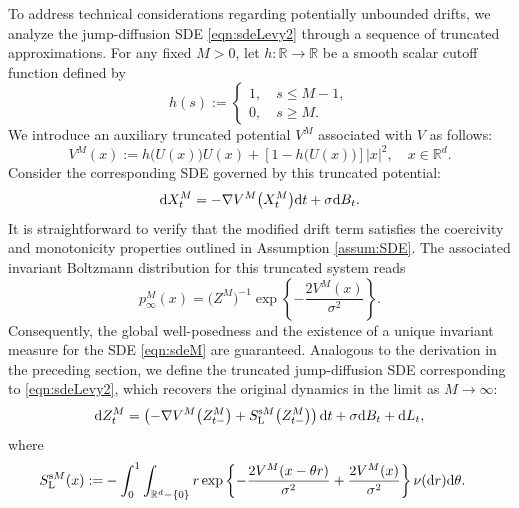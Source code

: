 To address technical considerations regarding potentially unbounded drifts, we analyze the jump-diffusion SDE \eqref{eqn:sdeLevy2} through a sequence of truncated approximations. For any fixed $M>0$, let $h:\mathbb{R}\to\mathbb{R}$ be a smooth scalar cutoff function defined by
\begin{equation}
    h(s):=\begin{cases}
        1,\quad s\leq M-1,\\
        0,\quad s\geq M.
    \end{cases}
\end{equation}
We introduce an auxiliary truncated potential $V^M$ associated with $V$ as follows:
\begin{equation}\label{VM}
    V^M(x):= h\big(U(x)\big)U(x) + \left[1-h\big (U(x)\big )\right]|x|^2,\quad x\in\mathbb{R}^d.
\end{equation}
Consider the corresponding SDE governed by this truncated potential:
\begin{equation}\label{eqn:sdeM}
    \mathrm{d} X^M_t= -\nabla V^M\big(X^M_t\big)\mathrm{d} t + \sigma \mathrm{d} B_t.
\end{equation}
It is straightforward to verify that the modified drift term satisfies the coercivity and monotonicity properties outlined in Assumption \ref{assum:SDE}. The associated invariant Boltzmann distribution for this truncated system reads
\begin{equation}\label{p^M_infty}
    p^M_\infty(x)=\big(Z^M\big)^{-1}\exp\left\{-\frac{2V^M(x)}{\sigma^2}\right\}.
\end{equation}
Consequently, the global well-posedness and the existence of a unique invariant measure for the SDE \eqref{eqn:sdeM} are guaranteed. Analogous to the derivation in the preceding section, we define the truncated jump-diffusion SDE corresponding to \eqref{eqn:sdeLevy2}, which recovers the original dynamics in the limit as $M\to\infty$:
\begin{equation}\label{eqn:sdeLevy2M}
    \mathrm{d} Z^M_t=\left(-\nabla V^M\big(Z^M_{t-}\big) + S^{\mathrm{s}M}_\mathrm{L}\big( Z^M_{t-}\big) \right)\mathrm{d} t+ \sigma \mathrm{d} B_t + \mathrm{d} L_t,
\end{equation}
where
\begin{equation}
\begin{aligned}
    S^{\mathrm{s}M}_\mathrm{L}(x):=& -\int_0^1\int_{\mathbb{R}^d-\{0\}} r\exp\left\{-\frac{2V^M(x- \theta r)}{\sigma^2} + \frac{2V^M(x)}{\sigma^2}\right\} \nu(\mathrm{d} r)\mathrm{d}\theta.
    \end{aligned}
\end{equation}

